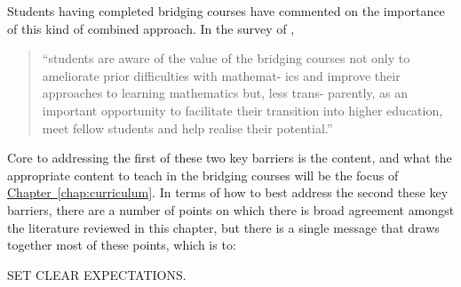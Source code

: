 \documentclass[twoside,12pt,a4paper]{report}
\newcommand{\refchap}[1]{\hyperref[chap:#1]{Chapter~\ref{chap:#1}}}
\begin{document}
Students having completed bridging courses have commented on the importance of this kind of combined approach. In the survey of , 
\begin{quote}
``students are aware of the value of the
bridging courses not only to ameliorate prior difficulties with mathemat-
ics and improve their approaches to learning mathematics but, less trans-
parently, as an important opportunity to facilitate their transition into
higher education, meet fellow students and help realise their potential.''
\end{quote}

Core to addressing the first of these two key barriers is the content, and what the appropriate content to teach in the bridging courses will be the focus of \refchap{curriculum}. In terms of how to best address the second these key barriers, there are a number of points on which there is broad agreement amongst the literature reviewed in this chapter, but there is a single message that draws together most of these points, which is to:
\begin{center}
	{\large SET CLEAR EXPECTATIONS.}
\end{center}
\end{document}
